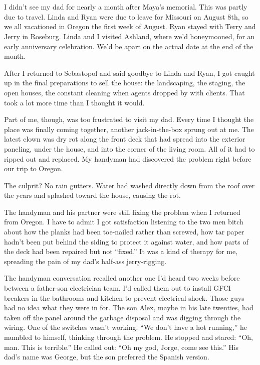 \documentclass[12pt]{book}
\begin{document}
\chapter{}

I didn't see my dad for nearly a month after Maya's memorial. This was partly due to travel. Linda and Ryan were due to leave for Missouri on August 8th, so we all vacationed in Oregon the first week of August. Ryan stayed with Terry and Jerry in Roseburg. Linda and I visited Ashland, where we'd honeymooned, for an early anniversary celebration. We'd be apart on the actual date at the end of the month.

After I returned to Sebastopol and said goodbye to Linda and Ryan, I got caught up in the final preparations to sell the house: the landscaping, the staging, the open houses, the constant cleaning when agents dropped by with clients. That took a lot more time than I thought it would.

Part of me, though, was too frustrated to visit my dad. Every time I thought the place was finally coming together, another jack-in-the-box sprung out at me. The latest clown was dry rot along the front deck that had spread into the exterior paneling, under the house, and into the corner of the living room. All of it had to ripped out and replaced. My handyman had discovered the problem right before our trip to Oregon.

The culprit? No rain gutters. Water had washed directly down from the roof over the years and splashed toward the house, causing the rot.

The handyman and his partner were still fixing the problem when I returned from Oregon. I have to admit I got satisfaction listening to the two men bitch about how the planks had been toe-nailed rather than screwed, how tar paper hadn't been put behind the siding to protect it against water, and how parts of the deck had been repaired but not ``fixed.'' It was a kind of therapy for me, spreading the pain of my dad's half-ass jerry-rigging.

The handyman conversation recalled another one I'd heard two weeks before between a father-son electrician team. I'd called them out to install GFCI breakers in the bathrooms and kitchen to prevent electrical shock. Those guys had no idea what they were in for. The son Alex, maybe in his late twenties, had taken off the panel around the garbage disposal and was digging through the wiring. One of the switches wasn't working. ``We don't have a hot running,'' he mumbled to himself, thinking through the problem. He stopped and stared: ``Oh, man. This is terrible.'' He called out: ``Oh my god, Jorge, come see this.'' His dad's name was George, but the son preferred the Spanish version.
\end{document}
